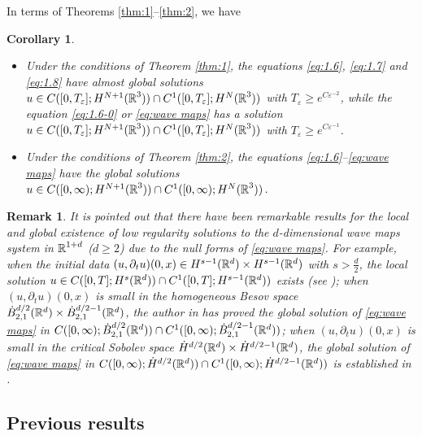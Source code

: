 \documentclass[11pt,twoside]{article}
\def\R{\mathop{\mathbb R\kern 0pt}\nolimits}
\def\f{\frac}
\def\p{\partial}
\def\ve{\varepsilon}
\theoremstyle{plain}
\newtheorem{cor}[theorem]{Corollary}
\theoremstyle{definition}
\newtheorem{remark}{Remark}[section]
\numberwithin{equation}{section}
\begin{document}
In terms of Theorems \ref{thm:1}--\ref{thm:2}, we have
\begin{cor}
\begin{itemize}
\item[(A)]  Under the conditions of Theorem \ref{thm:1},
the equations \eqref{eq:1.6}, \eqref{eq:1.7} and  \eqref{eq:1.8} have almost global solutions
$u\in C([0,T_\ve];H^{N+1}(\R^3))\cap C^1([0,T_\ve];H^N(\R^3))$ with $T_\ve\ge e^{C\ve^{-2}}$,
while the equation \eqref{eq:1.6-0} or \eqref{eq:wave maps} has a solution $u\in C([0,T_\ve];H^{N+1}(\R^3))\cap C^1([0,T_\ve];H^N(\R^3))$ with $T_\ve\ge e^{C\ve^{-1}}$.
\item[(B)]  Under the conditions of Theorem \ref{thm:2},
the equations \eqref{eq:1.6}--\eqref{eq:wave maps}  have the global solutions
$u\in C([0,\infty);H^{N+1}(\R^3))\cap C^1([0,\infty);H^N(\R^3))$.
\end{itemize}
\end{cor}

\begin{remark}\label{Rem-5A}
{\it It is pointed out that there have been remarkable results
for the local and global existence of low regularity solutions to the $d$-dimensional wave
maps system in  $\R^{1+d}$
($d\ge 2$) due to the null forms of  \eqref{eq:wave maps}. For example,
when the initial data $(u, \p_tu)(0,x)\in H^{s-1}(\Bbb R^d)\times H^{s-1}(\Bbb R^d)$ with $s>\f{d}{2}$,
the local solution $u\in C([0, T]; H^{s}(\Bbb R^d))\cap C^1([0, T]; H^{s-1}(\Bbb R^d))$ exists (see \cite{K-01,K-02});
when $(u, \p_tu)(0,x)$ is small in the homogeneous Besov space $\dot{B}_{2,1}^{d/2}(\Bbb R^d)\times\dot{B}_{2,1}^{d/2-1}(\Bbb R^d)$, the author in \cite{Tataru98,Tataru01} has proved the global
solution of \eqref{eq:wave maps} in $C([0, \infty); \dot{B}_{2,1}^{d/2}(\Bbb R^d))\cap C^1([0, \infty); \dot{B}_{2,1}^{d/2-1}(\Bbb R^d))$;
when $(u, \p_t u)(0,x)$ is small in the critical Sobolev space $\dot{H}^{d/2}(\Bbb R^d)\times\dot{H}^{d/2-1}(\Bbb R^d)$,
the global solution of \eqref{eq:wave maps} in $C([0, \infty); \dot{H}^{d/2}(\Bbb R^d))
\cap C^1([0, \infty); \dot{H}^{d/2-1}(\Bbb R^d))$
is established in \cite{TaoIMRN,TaoCMP}.}
\end{remark}





\subsection{Previous results}
\end{document}
